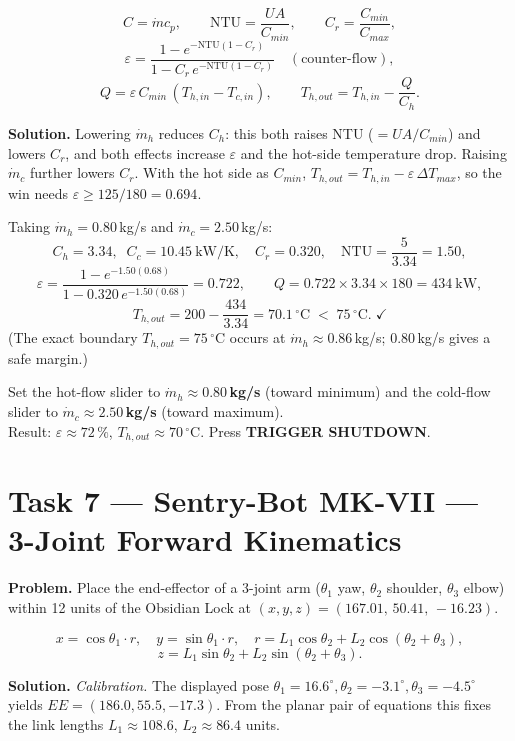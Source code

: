 \documentclass[11pt]{article}
\newcommand{\task}[2]{\section{Task #1 --- #2}}
\begin{document}
\begin{relbox}
\[
C=\dot m c_p,\qquad \text{NTU}=\frac{UA}{C_{min}},\qquad C_r=\frac{C_{min}}{C_{max}},
\]
\[
\varepsilon=\frac{1-e^{-\text{NTU}(1-C_r)}}{1-C_r\,e^{-\text{NTU}(1-C_r)}}
\quad(\text{counter-flow}),
\]
\[
Q=\varepsilon\,C_{min}\,(T_{h,in}-T_{c,in}),\qquad
T_{h,out}=T_{h,in}-\frac{Q}{C_h}.
\]
\end{relbox}

\textbf{Solution.} Lowering $\dot m_h$ reduces $C_h$: this both raises NTU
($=UA/C_{min}$) and lowers $C_r$, and both effects increase $\varepsilon$ and
the hot-side temperature drop. Raising $\dot m_c$ further lowers $C_r$.
With the hot side as $C_{min}$, $T_{h,out}=T_{h,in}-\varepsilon\,\Delta T_{max}$,
so the win needs $\varepsilon\ge125/180=0.694$.

Taking $\dot m_h=0.80$\,kg/s and $\dot m_c=2.50$\,kg/s:
\[
C_h=3.34,\;\; C_c=10.45\ \text{kW/K},\quad C_r=0.320,\quad
\text{NTU}=\frac{5}{3.34}=1.50,
\]
\[
\varepsilon=\frac{1-e^{-1.50(0.68)}}{1-0.320\,e^{-1.50(0.68)}}=0.722,\qquad
Q=0.722\times3.34\times180=434\ \text{kW},
\]
\[
T_{h,out}=200-\frac{434}{3.34}=70.1\,^{\circ}\text{C}\;<\;75\,^{\circ}\text{C}.\;\checkmark
\]
(The exact boundary $T_{h,out}=75\,^{\circ}$C occurs at
$\dot m_h\approx0.86$\,kg/s; $0.80$\,kg/s gives a safe margin.)

\begin{answer}
Set the hot-flow slider to \textbf{$\dot m_h \approx 0.80$\,kg/s} (toward minimum)
and the cold-flow slider to \textbf{$\dot m_c \approx 2.50$\,kg/s} (toward maximum).\\
Result: $\varepsilon\approx72\,\%$, $T_{h,out}\approx70\,^{\circ}$C. Press \textbf{TRIGGER SHUTDOWN}.
\end{answer}

\task{7}{Sentry-Bot MK-VII --- 3-Joint Forward Kinematics}
\textbf{Problem.} Place the end-effector of a 3-joint arm
($\theta_1$ yaw, $\theta_2$ shoulder, $\theta_3$ elbow) within 12 units of the
Obsidian Lock at $(x,y,z)=(167.01,\,50.41,\,-16.23)$.

\begin{relbox}
\[
x=\cos\theta_1\!\cdot\! r,\quad y=\sin\theta_1\!\cdot\! r,\quad
r=L_1\cos\theta_2+L_2\cos(\theta_2+\theta_3),
\]
\[
z=L_1\sin\theta_2+L_2\sin(\theta_2+\theta_3).
\]
\end{relbox}

\textbf{Solution.} \emph{Calibration.} The displayed pose
$\theta_1{=}16.6^{\circ},\theta_2{=}-3.1^{\circ},\theta_3{=}-4.5^{\circ}$ yields
$EE=(186.0,55.5,-17.3)$. From the planar pair of equations this fixes the link
lengths $L_1\approx108.6$, $L_2\approx86.4$ units.
\end{document}
